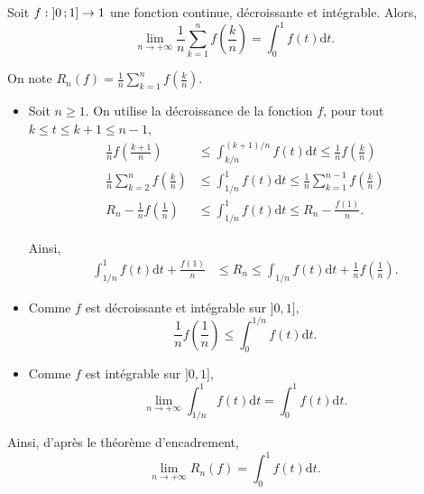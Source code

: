 


\begin{exercice}
    Soit $f : \left]0\,;1\right] \to 1$ une fonction continue, décroissante et intégrable. Alors,
    \[
    \lim\limits_{n \to +\infty} \frac{1}{n} \sum\limits_{k=1}^n f\left(\frac{k}{n}\right) = \displaystyle\int_0^1 f(t) \mathrm{d}t.
    \]
\end{exercice}

\begin{elem_sol}
On note $R_n(f) = \frac{1}{n} \sum\limits_{k=1}^n f\left(\frac{k}{n}\right)$.
\begin{itemize}
\item Soit $n \geq 1$. On utilise la décroissance de la fonction $f$, pour tout $k \leq t \leq k + 1 \leq n-1$,
\begin{align*}
\frac{1}{n} f\left(\frac{k+1}{n}\right) &\leq \displaystyle\int_{k/n}^{(k+1)/n} f(t) \mathrm{d}t \leq \frac{1}{n} f\left(\frac{k}{n}\right)\\
\frac{1}{n} \sum\limits_{k=2}^{n} f\left(\frac{k}{n}\right) &\leq \displaystyle\int_{1/n}^1 f(t) \mathrm{d}t \leq \frac{1}{n} \sum\limits_{k=1}^{n-1} f\left(\frac{k}{n}\right)\\
R_n - \frac{1}{n} f\left(\frac{1}{n}\right) &\leq \displaystyle\int_{1/n}^1 f(t) \mathrm{d}t \leq R_n - \frac{f(1)}{n}.
\end{align*}

Ainsi,
\begin{align*}
\displaystyle\int_{1/n}^1 f(t) \mathrm{d}t + \frac{f(1)}{n} &\leq R_n \leq \displaystyle\int_{1/n} f(t) \mathrm{d}t + \frac{1}{n}  f\left(\frac{1}{n}\right).
\end{align*}

\item Comme $f$ est décroissante et intégrable sur $]0, 1]$,
\[
\frac{1}{n} f\left(\frac{1}{n}\right) \leq \displaystyle\int_0^{1/n} f(t) \mathrm{d}t.
\]

\item Comme $f$ est intégrable sur $]0, 1]$,
\[
\lim\limits_{n\to+\infty} \displaystyle\int_{1/n}^1 f(t) \mathrm{d}t = \displaystyle\int_0^1 f(t) \mathrm{d}t.
\]
\end{itemize}

Ainsi, d'après le théorème d'encadrement,
\[
\lim\limits_{n\to+\infty} R_n(f) = \displaystyle\int_0^1 f(t) \mathrm{d}t.
\]
\end{elem_sol}

